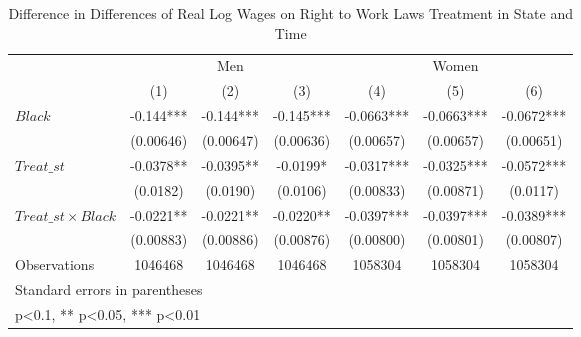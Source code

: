 \begin{table}[htbp]\centering
\def\sym#1{\ifmmode^{#1}\else\(^{#1}\)\fi}
\caption{Difference in Differences of Real Log Wages on Right to Work Laws Treatment in State and Time}
\begin{tabular}{l*{6}{c}}
\hline\hline
                    &\multicolumn{3}{c}{Men}                        &\multicolumn{3}{c}{Women}                      \\\cmidrule(lr){2-4}\cmidrule(lr){5-7}
                    &\multicolumn{1}{c}{(1)}   &\multicolumn{1}{c}{(2)}   &\multicolumn{1}{c}{(3)}   &\multicolumn{1}{c}{(4)}   &\multicolumn{1}{c}{(5)}   &\multicolumn{1}{c}{(6)}   \\
\hline
$ Black $           &      -0.144***&      -0.144***&      -0.145***&     -0.0663***&     -0.0663***&     -0.0672***\\
                    &   (0.00646)   &   (0.00647)   &   (0.00636)   &   (0.00657)   &   (0.00657)   &   (0.00651)   \\
[1em]
$ Treat\_{st} $      &     -0.0378** &     -0.0395** &     -0.0199*  &     -0.0317***&     -0.0325***&     -0.0572***\\
                    &    (0.0182)   &    (0.0190)   &    (0.0106)   &   (0.00833)   &   (0.00871)   &    (0.0117)   \\
[1em]
$ Treat\_{st} \times Black $&     -0.0221** &     -0.0221** &     -0.0220** &     -0.0397***&     -0.0397***&     -0.0389***\\
                    &   (0.00883)   &   (0.00886)   &   (0.00876)   &   (0.00800)   &   (0.00801)   &   (0.00807)   \\
\hline
Observations        &     1046468   &     1046468   &     1046468   &     1058304   &     1058304   &     1058304   \\
\hline\hline
\multicolumn{7}{l}{\footnotesize Standard errors in parentheses}\\
\multicolumn{7}{l}{\footnotesize * p<0.1, ** p<0.05, *** p<0.01}\\
\end{tabular}
\end{table}
